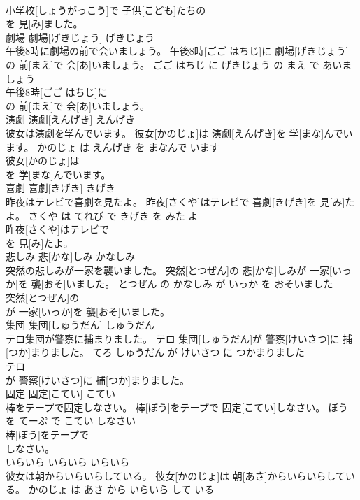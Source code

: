 \documentclass[8pt]{extreport}
\begin{document}
\begin{CJK}{UTF8}{min}
\\	小学校[しょうがっこう]で 子供[こども]たちの
\\	を 見[み]ました。			
\\	劇場	劇場[げきじょう]	げきじょう	
\\	午後8時に劇場の前で会いましょう。	午後8時[ごご はちじ]に 劇場[げきじょう]の 前[まえ]で 会[あ]いましょう。	ごご はちじ に げきじょう の まえ で あいましょう	
\\	午後8時[ごご はちじ]に
\\	の 前[まえ]で 会[あ]いましょう。			
\\	演劇	演劇[えんげき]	えんげき	
\\	彼女は演劇を学んでいます。	彼女[かのじょ]は 演劇[えんげき]を 学[まな]んでいます。	かのじょ は えんげき を まなんで います	
\\	彼女[かのじょ]は
\\	を 学[まな]んでいます。			
\\	喜劇	喜劇[きげき]	きげき	
\\	昨夜はテレビで喜劇を見たよ。	昨夜[さくや]はテレビで 喜劇[きげき]を 見[み]たよ。	さくや は てれび で きげき を みた よ	
\\	昨夜[さくや]はテレビで
\\	を 見[み]たよ。			
\\	悲しみ	悲[かな]しみ	かなしみ	
\\	突然の悲しみが一家を襲いました。	突然[とつぜん]の 悲[かな]しみが 一家[いっか]を 襲[おそ]いました。	とつぜん の かなしみ が いっか を おそいました	
\\	突然[とつぜん]の
\\	が 一家[いっか]を 襲[おそ]いました。			
\\	集団	集団[しゅうだん]	しゅうだん	
\\	テロ集団が警察に捕まりました。	テロ 集団[しゅうだん]が 警察[けいさつ]に 捕[つか]まりました。	てろ しゅうだん が けいさつ に つかまりました	
\\	テロ
\\	が 警察[けいさつ]に 捕[つか]まりました。			
\\	固定	固定[こてい]	こてい	
\\	棒をテープで固定しなさい。	棒[ぼう]をテープで 固定[こてい]しなさい。	ぼう を てーぷ で こてい しなさい	
\\	棒[ぼう]をテープで
\\	しなさい。			
\\	いらいら	いらいら	いらいら	
\\	彼女は朝からいらいらしている。	彼女[かのじょ]は 朝[あさ]からいらいらしている。	かのじょ は あさ から いらいら して いる	

\end{CJK}
\end{document}
